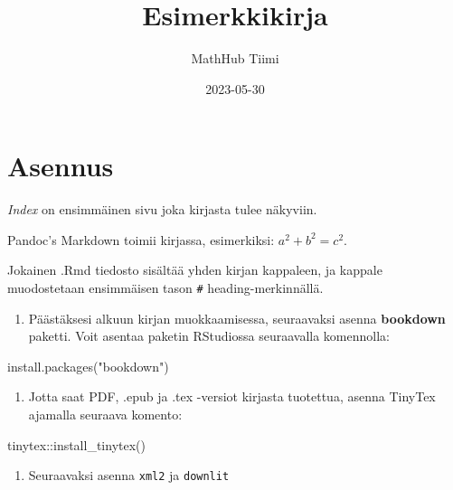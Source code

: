 \documentclass[
]{book}
\title{Esimerkkikirja}
\author{MathHub Tiimi}
\date{2023-05-30}
\newenvironment{Shaded}{\begin{snugshade}}{\end{snugshade}}
\newcommand{\FunctionTok}[1]{\textcolor[rgb]{0.00,0.00,0.00}{#1}}
\newcommand{\NormalTok}[1]{#1}
\newcommand{\SpecialCharTok}[1]{\textcolor[rgb]{0.00,0.00,0.00}{#1}}
\newcommand{\StringTok}[1]{\textcolor[rgb]{0.31,0.60,0.02}{#1}}
\providecommand{\tightlist}{%
  \setlength{\itemsep}{0pt}\setlength{\parskip}{0pt}}
\theoremstyle{definition}
\theoremstyle{definition}
\theoremstyle{definition}
\theoremstyle{definition}
\theoremstyle{remark}
\begin{document}
\maketitle

{
\setcounter{tocdepth}{1}
\tableofcontents
}
\hypertarget{asennus}{%
\chapter{Asennus}\label{asennus}}

\emph{Index} on ensimmäinen sivu joka kirjasta tulee näkyviin.

Pandoc's Markdown toimii kirjassa, esimerkiksi: \(a^2 + b^2 = c^2\).

Jokainen .Rmd tiedosto sisältää yhden kirjan kappaleen, ja kappale muodostetaan ensimmäisen tason \texttt{\#} heading-merkinnällä.

\begin{enumerate}
\def\labelenumi{\arabic{enumi}.}
\tightlist
\item
  Päästäksesi alkuun kirjan muokkaamisessa, seuraavaksi asenna \textbf{bookdown} paketti. Voit asentaa paketin RStudiossa seuraavalla komennolla:
\end{enumerate}

\begin{Shaded}
\begin{Highlighting}[]
\FunctionTok{install.packages}\NormalTok{(}\StringTok{"bookdown"}\NormalTok{)}
\end{Highlighting}
\end{Shaded}

\begin{enumerate}
\def\labelenumi{\arabic{enumi}.}
\setcounter{enumi}{1}
\tightlist
\item
  Jotta saat PDF, .epub ja .tex -versiot kirjasta tuotettua, asenna TinyTex ajamalla seuraava komento:
\end{enumerate}

\begin{Shaded}
\begin{Highlighting}[]
\NormalTok{tinytex}\SpecialCharTok{::}\FunctionTok{install\_tinytex}\NormalTok{()}
\end{Highlighting}
\end{Shaded}

\begin{enumerate}
\def\labelenumi{\arabic{enumi}.}
\setcounter{enumi}{2}
\tightlist
\item
  Seuraavaksi asenna \texttt{xml2} ja \texttt{downlit}
\end{enumerate}
\end{document}
